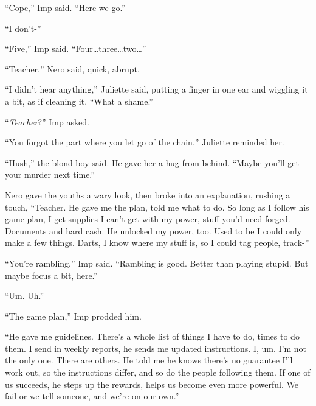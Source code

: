 ``Cope,'' Imp said.  ``Here we go.''



``I don't-''



``Five,'' Imp said.  ``Four\ldots three\ldots two\ldots''



``Teacher,'' Nero said, quick, abrupt.



``I didn't hear anything,'' Juliette said, putting a finger in one ear and wiggling it a bit, as if cleaning it.  ``What a shame.''



``\emph{Teacher}?''  Imp asked.



``You forgot the part where you let go of the chain,'' Juliette reminded her.



``Hush,'' the blond boy said.  He gave her a hug from behind.  ``Maybe you'll get your murder next time.''



Nero gave the youths a wary look, then broke into an explanation, rushing a touch, ``Teacher.  He gave me the plan, told me what to do.  So long as I follow his game plan, I get supplies I can't get with my power, stuff you'd need forged.  Documents and hard cash.  He unlocked my power, too.  Used to be I could only make a few things.  Darts, I know where my stuff is, so I could tag people, track-''



``You're rambling,'' Imp said.  ``Rambling is good.  Better than playing stupid.  But maybe focus a bit, here.''



``Um.  Uh.''



``The game plan,'' Imp prodded him.



``He gave me guidelines.  There's a whole list of things I have to do, times to do them.  I send in weekly reports, he sends me updated instructions.  I, um.  I'm not the only one.  There are others.  He told me he knows there's no guarantee I'll work out, so the instructions differ, and so do the people following them.  If one of us succeeds, he steps up the rewards, helps us become even more powerful.  We fail or we tell someone, and we're on our own.''



